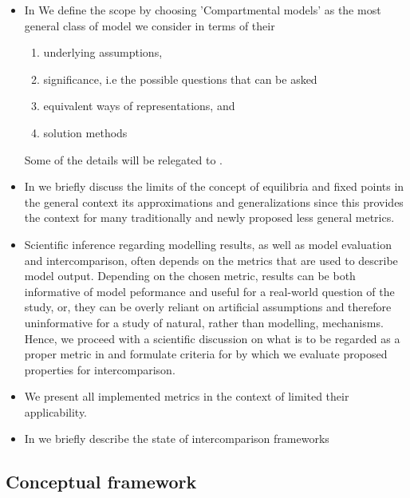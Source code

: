 \begin{itemize}
  \item
    In  We define the scope by choosing 'Compartmental models' as the most general class of model we consider in terms of their 
    \begin{enumerate}
      \item underlying assumptions, 
      \item significance, i.e the possible questions that can be asked 
      \item equivalent ways of representations, and 
      \item solution methods 
    \end{enumerate}
    Some of the details will be relegated to .
  \item 
    In  we briefly discuss the limits of the concept of equilibria and fixed points in the general context its approximations and generalizations since this provides the context for many traditionally and newly proposed less general metrics.
  \item
Scientific inference regarding modelling results, as well as model evaluation and intercomparison, often depends on the metrics that are used to describe model output.
Depending on the chosen metric, results can be both informative of model peformance and useful for a real-world question of the study, or, they can be overly reliant on artificial assumptions and therefore uninformative for a study of natural, rather than modelling, mechanisms.
Hence, we proceed with a scientific discussion on what is to be regarded as a proper metric in  and formulate criteria for by which we evaluate proposed properties for intercomparison.
  \item
    We present all implemented metrics in the 
    context of limited their applicability. 
  \item 
    In  we briefly describe the state of intercomparison frameworks
\end{itemize}

\subsection{Conceptual framework}
\label{sec:ConceptualFramework}
\begin{figure}
  \label{fig:modelGraph}
  
\end{figure}


